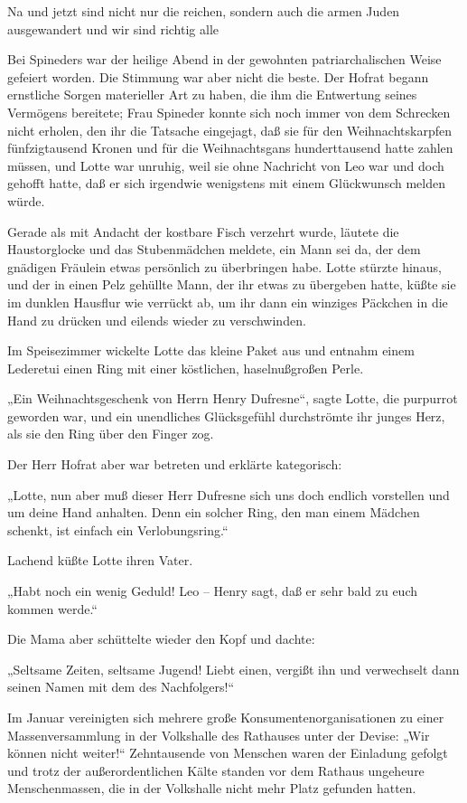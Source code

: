 Na und jetzt sind nicht nur die reichen, sondern auch die armen
Juden ausgewandert und wir sind richtig alle

\tb{* * *}
Bei Spineders war der heilige Abend in der gewohnten
patriarchalischen Weise gefeiert worden. Die Stimmung war aber
nicht die beste. Der Hofrat begann ernstliche Sorgen materieller
Art zu haben, die ihm die Entwertung seines Vermögens bereitete;
Frau Spineder konnte sich noch immer von dem Schrecken nicht
erholen, den ihr die Tatsache eingejagt, daß sie für den
Weihnachtskarpfen fünfzigtausend Kronen und für die Weihnachtsgans
hunderttausend hatte zahlen müssen, und Lotte war unruhig, weil sie
ohne Nachricht von Leo war und doch gehofft hatte, daß er sich
irgendwie wenigstens mit einem Glückwunsch melden würde.

Gerade als mit Andacht der kostbare Fisch verzehrt wurde, läutete
die Haustorglocke und das Stubenmädchen meldete, ein Mann sei da,
der dem gnädigen Fräulein etwas persönlich zu überbringen habe.
Lotte stürzte hinaus, und der in einen Pelz gehüllte Mann, der ihr
etwas zu übergeben hatte, küßte sie im dunklen Hausflur wie
 verrückt ab, um ihr dann ein winziges Päckchen in
die Hand zu drücken und eilends wieder zu verschwinden.

Im Speisezimmer wickelte Lotte das kleine Paket aus und entnahm
einem Lederetui einen Ring mit einer köstlichen, haselnußgroßen
Perle.

„Ein Weihnachtsgeschenk von Herrn Henry Dufresne“, sagte Lotte, die
purpurrot geworden war, und ein unendliches Glücksgefühl
durchströmte ihr junges Herz, als sie den Ring über den Finger
zog.

Der Herr Hofrat aber war betreten und erklärte kategorisch:

„Lotte, nun aber muß dieser Herr Dufresne sich uns doch endlich
vorstellen und um deine Hand anhalten. Denn ein solcher Ring, den
man einem Mädchen schenkt, ist einfach ein Verlobungsring.“

Lachend küßte Lotte ihren Vater.

„Habt noch ein wenig Geduld! Leo – Henry sagt, daß er sehr bald zu
euch kommen werde.“

Die Mama aber schüttelte wieder den Kopf und dachte:

„Seltsame Zeiten, seltsame Jugend! Liebt einen, vergißt ihn und
verwechselt dann seinen Namen mit dem des Nachfolgers!“

Im Januar vereinigten sich mehrere große Konsumentenorganisationen
zu einer Massenversammlung in der Volkshalle des Rathauses unter
der Devise: „Wir können nicht weiter!“ Zehntausende von Menschen
waren der Einladung gefolgt und trotz der außerordentlichen Kälte
standen vor dem Rathaus ungeheure Menschenmassen, die in der
Volkshalle nicht mehr Platz gefunden hatten.

